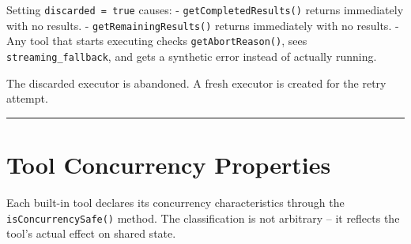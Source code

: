 \documentclass[
  english,
  11pt,
  letterpaper,
]{book}
\begin{document}
Setting \texttt{discarded\ =\ true} causes: -
\texttt{getCompletedResults()} returns immediately with no results. -
\texttt{getRemainingResults()} returns immediately with no results. -
Any tool that starts executing checks \texttt{getAbortReason()}, sees
\texttt{streaming\_fallback}, and gets a synthetic error instead of
actually running.

The discarded executor is abandoned. A fresh executor is created for the
retry attempt.

\begin{center}\rule{0.5\linewidth}{0.5pt}\end{center}

\section{Tool Concurrency Properties}\label{tool-concurrency-properties}

Each built-in tool declares its concurrency characteristics through the
\texttt{isConcurrencySafe()} method. The classification is not arbitrary
-- it reflects the tool's actual effect on shared state.
\end{document}
